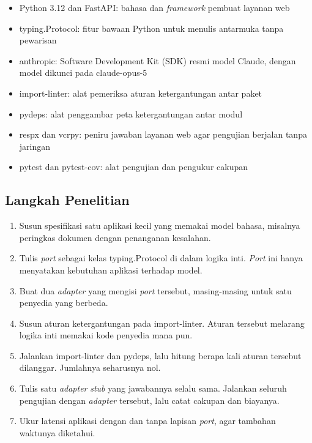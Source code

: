 \documentclass[11pt,a4paper]{article}
\begin{document}
\begin{itemize}[leftmargin=*]
  \item Python 3.12 dan FastAPI: bahasa dan \textit{framework} pembuat layanan web
  \item typing.Protocol: fitur bawaan Python untuk menulis antarmuka tanpa pewarisan
  \item anthropic: Software Development Kit (SDK) resmi model Claude, dengan model dikunci pada claude-opus-5
  \item import-linter: alat pemeriksa aturan ketergantungan antar paket
  \item pydeps: alat penggambar peta ketergantungan antar modul
  \item respx dan vcrpy: peniru jawaban layanan web agar pengujian berjalan tanpa jaringan
  \item pytest dan pytest-cov: alat pengujian dan pengukur cakupan
\end{itemize}

\subsection{Langkah Penelitian}

\begin{enumerate}[leftmargin=*]
  \item Susun spesifikasi satu aplikasi kecil yang memakai model bahasa, misalnya peringkas dokumen dengan penanganan kesalahan.
  \item Tulis \textit{port} sebagai kelas typing.Protocol di dalam logika inti. \textit{Port} ini hanya menyatakan kebutuhan aplikasi terhadap model.
  \item Buat dua \textit{adapter} yang mengisi \textit{port} tersebut, masing-masing untuk satu penyedia yang berbeda.
  \item Susun aturan ketergantungan pada import-linter. Aturan tersebut melarang logika inti memakai kode penyedia mana pun.
  \item Jalankan import-linter dan pydeps, lalu hitung berapa kali aturan tersebut dilanggar. Jumlahnya seharusnya nol.
  \item Tulis satu \textit{adapter} \textit{stub} yang jawabannya selalu sama. Jalankan seluruh pengujian dengan \textit{adapter} tersebut, lalu catat cakupan dan biayanya.
  \item Ukur latensi aplikasi dengan dan tanpa lapisan \textit{port}, agar tambahan waktunya diketahui.
\end{enumerate}
\end{document}
